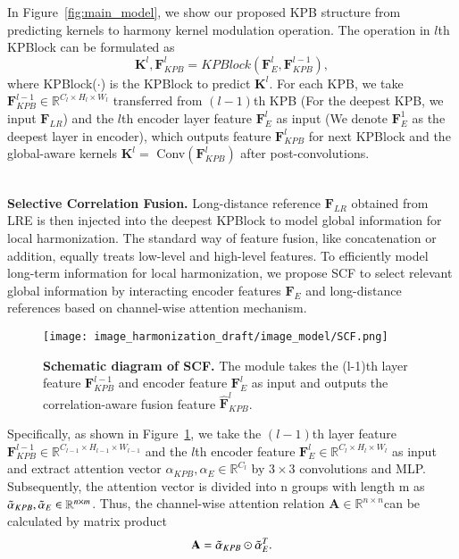\documentclass[10pt,twocolumn,letterpaper]{article}
\begin{document}
In Figure~\ref{fig:main_model}, we show our proposed KPB structure from predicting kernels to harmony kernel modulation operation. The operation in $l$th KPBlock can be formulated as
\begin{equation}
    {\mathbf{K}^l, \mathbf{F}^l_{KPB} = KPBlock (\mathbf{F}^l_E,\mathbf{F}^{l-1}_{KPB})},
\end{equation}
where KPBlock($\cdot$) is the KPBlock to predict $\mathbf{K}^l$. For each KPB, we take $\mathbf{F}^{l-1}_{KPB} \in \mathbb{R}^{C_l \times H_l \times W_l}$ transferred from $(l-1)$th KPB (For the deepest KPB, we input $\mathbf{F}_{LR}$) and the $l$th encoder layer feature $\mathbf{F}^l_E$ as input  (We denote $\mathbf{F}_E^1$ as the deepest layer in encoder), which outputs feature $\mathbf{F}^{l}_{KPB}$ for next KPBlock and the global-aware kernels $\mathbf{K}^l=$ Conv$(\mathbf{F}^{l}_{KPB})$ after post-convolutions.

~\\
\noindent \textbf{Selective Correlation Fusion.}
Long-distance reference $\mathbf{F}_{LR}$ obtained from LRE is then injected into the deepest KPBlock to model global information for local harmonization. The standard way of feature fusion, like concatenation or addition, equally treats low-level and high-level features. To efficiently model long-term information for local harmonization, we propose SCF to select relevant global information by interacting encoder features $\mathbf{F}_E$ and long-distance references based on channel-wise attention mechanism. 

\begin{figure}[!t]
    \centering
    \texttt{[image: image\_harmonization\_draft/image\_model/SCF.png]}
    \caption{{\bf Schematic diagram of SCF.} The module takes the (l-1)th layer feature $\mathbf{F}^{l-1}_{KPB}$ and encoder feature $\mathbf{F}^{l}_E$ as input and outputs the correlation-aware fusion feature $\hat{\mathbf{F}}_{KPB}^{l}$.}
    \label{fig:jsf}
    \vspace{-1.0em}
\end{figure} 

Specifically, as shown in Figure~\ref{fig:jsf}, we take the $(l-1)$th layer feature $\mathbf{F}^{l-1}_{KPB} \in \mathbb{R}^{C_{l-1} \times H_{l-1} \times W_{l-1}}$ and the $l$th encoder feature $\mathbf{F}^{l}_E \in \mathbb{R}^{C_{l} \times H_{l} \times W_{l}}$ as input and extract attention vector $\alpha_{KPB}, \alpha_{E} \in \mathbb{R}^{C_{l}}$ by $3\times 3$ convolutions and MLP. Subsequently, the attention vector is divided into n groups with length m as $\Tilde{\alpha}_{KPB}, \Tilde{\alpha}_{E} \in \mathbb{R}^{n \times m}$. Thus, the channel-wise attention relation $ \mathbf{A} \in \mathbb{R}^{n \times n}$can be calculated by matrix product
\begin{equation}
    \mathbf{A} = \Tilde{\alpha}_{KPB} \odot \Tilde{\alpha}_{E}^{T}.
\end{equation}
\end{document}
